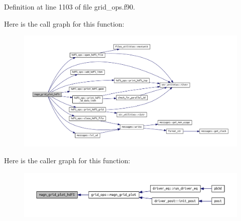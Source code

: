 Definition at line 1103 of file grid\+\_\+ops.\+f90.

Here is the call graph for this function\+:
\nopagebreak
\begin{figure}[H]
\begin{center}
\leavevmode
\includegraphics[width=350pt]{grid__ops_8f90_a7bfbb51880742066ae3add67ee03df2d_cgraph}
\end{center}
\end{figure}
Here is the caller graph for this function\+:
\nopagebreak
\begin{figure}[H]
\begin{center}
\leavevmode
\includegraphics[width=350pt]{grid__ops_8f90_a7bfbb51880742066ae3add67ee03df2d_icgraph}
\end{center}
\end{figure}
